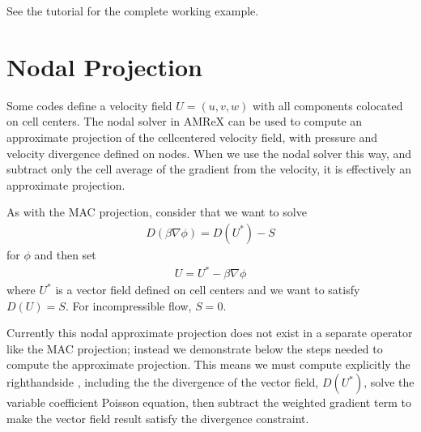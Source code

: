 \documentclass[letterpaper,10pt,english]{sphinxmanual}
\begin{document}
\sphinxAtStartPar
See the  tutorial for the complete working example.


\section{Nodal Projection}
\label{\detokenize{LinearSolvers:nodal-projection}}
\sphinxAtStartPar
Some codes define a velocity field \(U = (u,v,w)\) with all
components co\sphinxhyphen{}located on cell centers.  The nodal solver in AMReX
can be used to compute an approximate projection of the cell\sphinxhyphen{}centered
velocity field, with pressure and velocity divergence defined on nodes.
When we use the nodal solver this way, and subtract only the cell average
of the gradient from the velocity, it is effectively an approximate projection.

\sphinxAtStartPar
As with the MAC projection, consider that we want to solve
\begin{equation*}
\begin{split}D( \beta \nabla \phi) = D(U^*) - S\end{split}
\end{equation*}
\sphinxAtStartPar
for \(\phi\) and then set
\begin{equation*}
\begin{split}U = U^* - \beta \nabla \phi\end{split}
\end{equation*}
\sphinxAtStartPar
where \(U^*\) is a vector field defined on cell centers and we want to satisfy
\(D(U) = S\).  For incompressible flow,  \(S = 0\).

\sphinxAtStartPar
Currently this nodal approximate projection does not exist in a separate
operator like the MAC projection; instead we demonstrate below the steps needed
to compute the approximate projection.  This means we must compute explicitly the
right\sphinxhyphen{}hand\sphinxhyphen{}side , including the the divergence of the vector field, \(D(U^*)\),
solve the variable coefficient Poisson equation, then subtract the weighted
gradient term to make the vector field result satisfy the divergence constraint.
\end{document}
